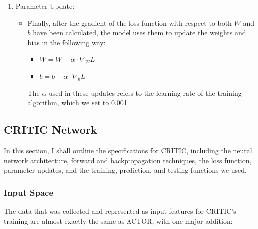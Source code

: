 \documentclass[11pt]{article}
\begin{document}
\begin{enumerate}
    \item Parameter Update:
    \begin{itemize}    
        \item Finally, after the gradient of the loss function with respect to both $W$ and $b$ have been calculated, the model uses them to update the weights and bias in the following way:
        \begin{itemize}
            \item $W = W - \alpha \cdot \nabla_{W} L$
            \item $b = b - \alpha \cdot \nabla_{b} L$
        \end{itemize}
        The $\alpha$ used in these updates refers to the learning rate of the training algorithm, which we set to 0.001
    \end{itemize}
\end{enumerate}

\subsection{CRITIC Network}

In this section, I shall outline the specifications for CRITIC, including the neural network architecture, forward and backpropagation techniques, the loss function, parameter updates, and the training, prediction, and testing functions we used.

\subsubsection{Input Space}

The data that was collected and represented as input features for CRITIC's training are almost exactly the same as ACTOR, with one major addition:
\end{document}
